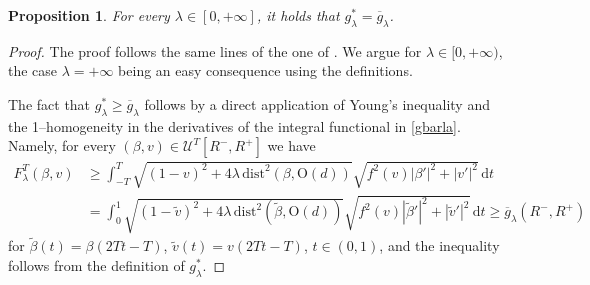 \documentclass[a4paper,reqno]{amsart}
\newcommand\calU{\mathcal{U}}
\newcommand\dist{{\mathrm{dist}}}
\newcommand\dt{{\,\mathrm{d}t}}
\newtheorem{proposition}[definition]{Proposition}
\theoremstyle{remark}
\newcommand{\ol}{\overline}
\newcommand{\On}{\mathrm{O}(d)}
\numberwithin{equation}{section}
\begin{document}
\begin{proposition}\label{le:equivglambda}
For every $\lambda \in[0,+\infty]$, it holds that $g^*_\lambda=\ol g_\lambda$.
\end{proposition}
\begin{proof} 
The proof follows the same lines of the one of \cite[Proposition~4.3]{CFI14}. We argue for $\lambda \in [0,+\infty)$, the case $\lambda=+\infty$ being an easy consequence using the definitions.

The fact that $g^*_\lambda\geq \ol g_\lambda$ follows by a direct application of Young's inequality  and the  1--homogeneity in the derivatives of the integral functional in \eqref{gbarla}. Namely, for every $(\beta,v)\in
\calU^T[ R^-,R^+]$ we have
\[
\begin{split}
	F^T_\lambda(\beta,v) & \geq
	\int_{-T}^T \sqrt{(1-v)^2 + 4\lambda \, \dist^2(\beta, \On)} \sqrt{f^2(v) |\beta'|^2+|v'|^2} \dt \\ & =
	\int_0^1 \sqrt{(1-\widetilde v)^2 + 4\lambda \, \dist^2(\widetilde \beta, \On)} \sqrt{f^2(v) |\widetilde \beta'|^2+|\widetilde v'|^2} \dt \ge\ol g_\lambda(R^-,R^+)
\end{split}
\] 
for $\widetilde \beta (t)= \beta(2Tt-T)$, $\widetilde v (t)=v(2Tt-T)$, $t\in (0,1)$, and the inequality follows from the definition of $g^*_\lambda$.


\end{proof}
\end{document}
